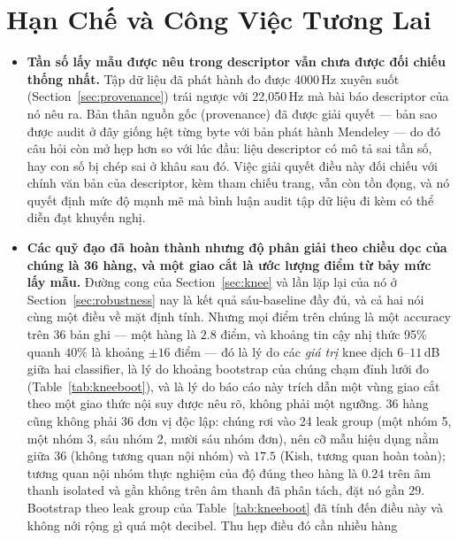 \documentclass[11pt]{article}
\begin{document}
\section{Hạn Chế và Công Việc Tương Lai}
\label{sec:conclusion}

\begin{itemize}
  \item \textbf{Tần số lấy mẫu được nêu trong descriptor vẫn chưa được
    đối chiếu thống nhất.} Tập dữ liệu đã phát hành đo được 4000\,Hz
    xuyên suốt (Section~\ref{sec:provenance}) trái ngược với 22{,}050\,Hz
    mà bài báo descriptor của nó nêu ra. Bản thân nguồn gốc (provenance)
    đã được giải quyết --- bản sao được audit ở đây giống hệt từng byte
    với bản phát hành Mendeley --- do đó câu hỏi còn mở hẹp hơn so với
    lúc đầu: liệu descriptor có mô tả sai tần số, hay con số bị chép sai
    ở khâu sau đó. Việc giải quyết điều này đối chiếu với chính văn bản
    của descriptor, kèm tham chiếu trang, vẫn còn tồn đọng, và nó quyết
    định mức độ mạnh mẽ mà bình luận audit tập dữ liệu đi kèm có thể diễn
    đạt khuyến nghị.
  \item \textbf{Các quỹ đạo đã hoàn thành nhưng độ phân giải theo
    chiều dọc của chúng là 36 hàng, và một giao cắt là ước lượng điểm từ
    bảy mức lấy mẫu.} Đường cong của Section~\ref{sec:knee}
    và lần lặp lại của nó ở Section~\ref{sec:robustness} nay là kết quả
    sáu-baseline đầy đủ, và cả hai nói cùng một điều về mặt định tính.
    Nhưng mọi điểm trên chúng là một accuracy trên 36 bản ghi --- một
    hàng là $2.8$ điểm, và khoảng tin cậy nhị thức 95\% quanh $40\%$ là
    khoảng $\pm16$ điểm --- đó là lý do các \emph{giá trị} knee dịch
    $6$--$11$\,dB giữa hai classifier, là lý do khoảng bootstrap của chúng
    chạm đỉnh lưới đo (Table~\ref{tab:kneeboot}), và là lý do báo cáo này
    trích dẫn một vùng giao cắt theo một giao thức nội suy được nêu rõ,
    không phải một ngưỡng. 36 hàng cũng không phải 36 đơn
    vị độc lập: chúng rơi vào 24 leak group (một nhóm 5, một nhóm 3, sáu
    nhóm 2, mười sáu nhóm đơn), nên cỡ mẫu hiệu dụng nằm giữa 36 (không
    tương quan nội nhóm) và $17.5$ (Kish, tương quan hoàn toàn); tương
    quan nội nhóm thực nghiệm của độ đúng theo hàng là $0.24$ trên âm
    thanh isolated và gần không trên âm thanh đã phân tách, đặt nó gần
    $29$. Bootstrap theo leak group của Table~\ref{tab:kneeboot} đã tính
    đến điều này và không nới rộng gì quá một decibel. Thu hẹp điều đó cần nhiều hàng

\end{itemize}
\end{document}
